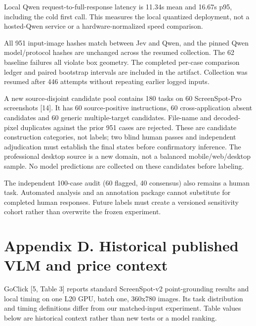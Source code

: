 \documentclass[10pt]{article}
\begin{document}
Local Qwen request-to-full-response latency is 11.34s mean and 16.67s p95, including the cold first call. This measures the local quantized deployment, not a hosted-Qwen service or a hardware-normalized speed comparison.

All 951 input-image hashes match between Jev and Qwen, and the pinned Qwen model/protocol hashes are unchanged across the resumed collection. The 62 baseline failures all violate box geometry. The completed per-case comparison ledger and paired bootstrap intervals are included in the artifact. Collection was resumed after 446 attempts without repeating earlier logged inputs.

A new source-disjoint candidate pool contains 180 tasks on 60 ScreenSpot-Pro screenshots [14]. It has 60 source-positive instructions, 60 cross-application absent candidates and 60 generic multiple-target candidates. File-name and decoded-pixel duplicates against the prior 951 cases are rejected. These are candidate construction categories, not labels; two blind human passes and independent adjudication must establish the final states before confirmatory inference. The professional desktop source is a new domain, not a balanced mobile/web/desktop sample. No model predictions are collected on these candidates before labeling.

The independent 100-case audit (60 flagged, 40 consensus) also remains a human task. Automated analysis and an annotation package cannot substitute for completed human responses. Future labels must create a versioned sensitivity cohort rather than overwrite the frozen experiment.

\section*{Appendix D. Historical published VLM and price context}
GoClick [5, Table 3] reports standard ScreenSpot-v2 point-grounding results and local timing on one L20 GPU, batch one, 360x780 images. Its task distribution and timing definitions differ from our matched-input experiment. Table values below are historical context rather than new tests or a model ranking.
\end{document}
